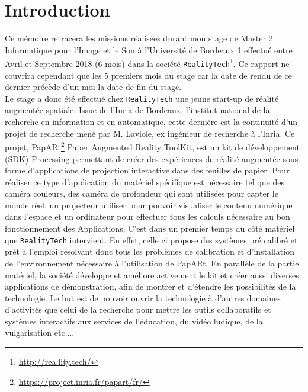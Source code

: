 \chapter{Introduction}
\label{chap:intro}

Ce mémoire retracera les missions réalisées durant mon stage de Master 2 Informatique pour l'Image et le Son à l'Université de Bordeaux 1 effectué entre Avril et Septembre 2018 (6 mois) dans la société \texttt{RealityTech}\footnote{\href{http://rea.lity.tech/}{http://rea.lity.tech/}}. Ce rapport ne couvrira cependant que les 5 premiers mois du stage car la date de rendu de ce dernier précède d'un moi la date de fin du stage.\\

Le stage a donc été effectué chez \texttt{RealityTech} une jeune start-up de réalité augmentée spatiale. Issue de l'Inria de Bordeaux, l'institut national de la recherche en information et en automatique, cette dernière est la continuité d'un projet de recherche mené par M. Laviole, ex ingénieur de recherche à l'Inria. Ce projet, PapARt\footnote{\href{https://project.inria.fr/papart/fr/}{https://project.inria.fr/papart/fr/}} Paper Augmented Reality ToolKit, est un kit de développement (SDK) Processing permettant de créer des expériences de réalité augmentée sous forme d'applications de projection interactive dans des feuilles de papier. Pour réaliser ce type d'application du matériel spécifique est nécessaire tel que des caméra couleurs, des caméra de profondeur qui sont utilisées pour capter le monde réel, un projecteur utiliser pour pouvoir visualiser le contenu numérique dans l'espace et un ordinateur pour effectuer tous les calculs nécessaire au bon fonctionnement des Applications. C'est dans un premier temps du côté matériel que \texttt{RealityTech} intervient. En effet, celle ci propose des systèmes pré calibré et prêt à l'emploi résolvant donc tous les problèmes de calibration et d'installation de l'environnement nécessaire à l'utilisation de PapARt. En parallèle de la partie matériel, la société développe et améliore activement le kit et créer aussi diverses applications de démonstration, afin de montrer et d'étendre les possibilités de la technologie. Le but est de pouvoir ouvrir la technologie à d'autres domaines d'activités que celui de la recherche pour mettre les outils collaboratifs et systèmes interactifs aux services de l'éducation, du vidéo ludique, de la vulgarisation etc....

